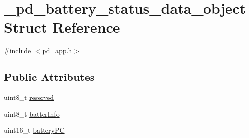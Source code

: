 \hypertarget{struct__pd__battery__status__data__object}{\section{\-\_\-pd\-\_\-battery\-\_\-status\-\_\-data\-\_\-object Struct Reference}
\label{struct__pd__battery__status__data__object}
}


{\ttfamily \#include $<$pd\-\_\-app.\-h$>$}

\subsection*{Public Attributes}
\begin{DoxyCompactItemize}
\item 
uint8\-\_\-t \hyperlink{struct__pd__battery__status__data__object_aeeed3d86e17f59048c77223df46a8348}{reserved}
\item 
uint8\-\_\-t \hyperlink{struct__pd__battery__status__data__object_a32d8fab9c01317f358ad5b2fe32c48e7}{batter\-Info}
\item 
uint16\-\_\-t \hyperlink{struct__pd__battery__status__data__object_a9e8c5885cae3cd051e4f8bd18db1a9db}{battery\-P\-C}
\end{DoxyCompactItemize}


